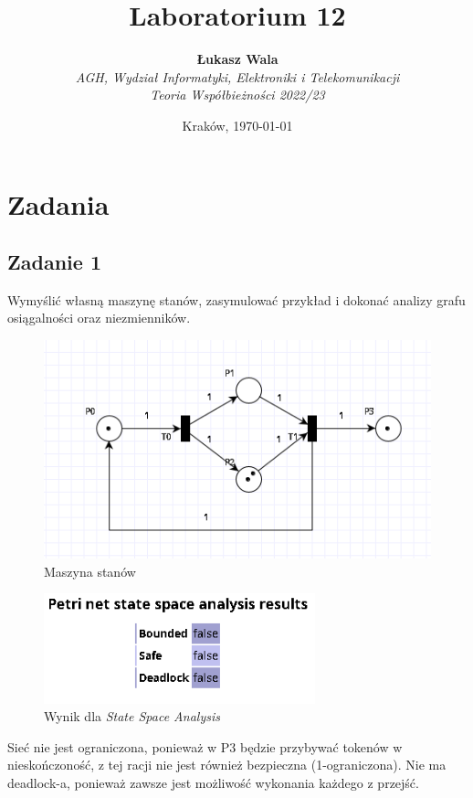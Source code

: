 \documentclass{article}
\title{Laboratorium 12}
\author{\textbf{Łukasz Wala}\\
    \textit{AGH, Wydział Informatyki, Elektroniki i Telekomunikacji} \\
    \textit{Teoria Współbieżności 2022/23}}
\date{Kraków, \today}
\begin{document}
\maketitle

\section{Zadania}

\subsection{Zadanie 1}
Wymyślić własną maszynę stanów, zasymulować przykład i dokonać analizy grafu osiągalności oraz niezmienników.

\begin{figure}[H]
    \centering
    \includegraphics[width=\textwidth]{net_1.png}
    \caption{Maszyna stanów}
\end{figure}

\begin{figure}[H]
    \centering
    \includegraphics[width=0.7\textwidth]{analysis_1.png}
    \caption{Wynik dla \textit{State Space Analysis}}
\end{figure}

Sieć nie jest ograniczona, ponieważ w P3 będzie przybywać tokenów w nieskończoność, z tej racji nie jest 
również bezpieczna (1-ograniczona). Nie ma deadlock-a, ponieważ zawsze jest możliwość wykonania każdego z
przejść.
\end{document}

